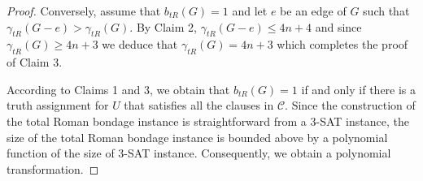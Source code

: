 \documentclass[10pt,a4paper]{amsart}
\begin{document}
\begin{proof}
Conversely, assume that $b_{tR}(G)=1$ and let $e$ be an edge of $G$ such
that $\gamma _{tR}(G-e)>\gamma _{tR}(G)$. By Claim 2, $\gamma _{tR}(G-e)\leq
4n+4$ and since $\gamma _{tR}(G)\geq 4n+3$ we deduce that $\gamma_{tR}(G)=4n+3$ which completes the proof of Claim 3.

According to Claims 1 and 3, we obtain that $b_{tR}(G)=1$ if and only if
there is a truth assignment for $U$ that satisfies all the clauses in $\mathcal{C}$. Since the construction of the total Roman bondage instance is straightforward from a 3-SAT instance, the size of the total Roman bondage
instance is bounded above by a polynomial function of the size of 3-SAT
instance. Consequently, we obtain a polynomial transformation.
\end{proof}
\end{document}
